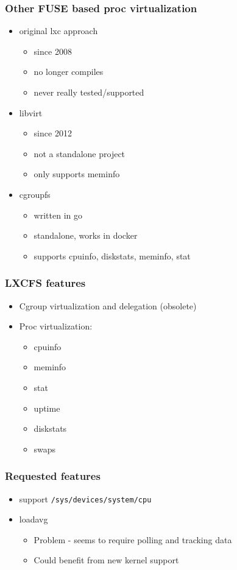\documentclass{beamer}
\begin{document}
\begin{frame}
\frametitle{Other FUSE based proc virtualization}
	\begin{itemize}
	\item original lxc approach
		\begin{itemize}
		\item since 2008
		\item no longer compiles
		\item never really tested/supported
		\end{itemize}
	\item libvirt
		\begin{itemize}
		\item since 2012
		\item not a standalone project
		\item only supports meminfo
		\end{itemize}
	\item cgroupfs
		\begin{itemize}
		\item written in go
		\item standalone, works in docker
		\item supports cpuinfo, diskstats, meminfo, stat
		\end{itemize}
	\end{itemize}
\end{frame}

\begin{frame}
\frametitle{LXCFS features}
	\begin{itemize}
	\item Cgroup virtualization and delegation (obsolete)
	\item Proc virtualization:
		\begin{itemize}
		\item cpuinfo
		\item meminfo
		\item stat
		\item uptime
		\item diskstats
		\item swaps
		\end{itemize}
	\end{itemize}
\end{frame}

\begin{frame}
\frametitle{Requested features}
	\begin{itemize}
	\item support {\tt /sys/devices/system/cpu}
	\item loadavg
		\begin{itemize}
		\item Problem - seems to require polling and tracking data
		\item Could benefit from new kernel support
		\end{itemize}
	\end{itemize}
\end{frame}
\end{document}

